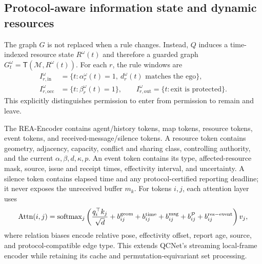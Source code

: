 \documentclass[letterpaper]{article} %
\newcommand{\Pset}{\ensuremath{\mathcal P}}
\newcommand{\Mset}{\ensuremath{\mathcal M}}
\begin{document}
\subsection{Protocol-aware information state and dynamic resources}
\label{sec:rea}
The graph $G$ is not replaced when a rule changes. Instead, $Q$ induces a time-indexed resource state $R^\omega(t)$ and therefore a guarded graph $G^\omega_t=\mathsf T(\Mset,R^\omega(t))$. For each $r$, the rule windows are
\begin{align}
I_{r,\mathrm{in}}^\omega&=\{t:\alpha_r^\omega(t)=1,\ d_r^\omega(t)\text{ matches the ego}\},\nonumber\\
I_{r,\mathrm{occ}}^\omega&=\{t:\beta_r^\omega(t)=1\},\qquad
I_{r,\mathrm{out}}^\omega=\{t:\text{exit is protected}\}.
\label{eq:rule-windows}
\end{align}
This explicitly distinguishes permission to enter from permission to remain and leave.

The REA-Encoder contains agent/history tokens, map tokens, resource tokens, event tokens, and received-message/silence tokens. A resource token contains geometry, adjacency, capacity, conflict and sharing class, controlling authority, and the current $\alpha,\beta,d,\kappa,p$. An event token contains its type, affected-resource mask, source, issue and receipt times, effectivity interval, and uncertainty. A silence token contains elapsed time and any protocol-certified reporting deadline; it never exposes the unreceived buffer $m_k$. For tokens $i,j$, each attention layer uses
\begin{equation}
\operatorname{Attn}(i,j)=
\operatorname{softmax}_j\left(
\frac{q_i^\top k_j}{\sqrt d}
+b^{\rm geom}_{ij}+b^{\rm time}_{ij}+b^{\rm msg}_{ij}
+b^{\Pset}_{ij}+b^{\rm res-event}_{ij}\right)v_j ,
\label{eq:rea-attn}
\end{equation}
where relation biases encode relative pose, effectivity offset, report age, source, and protocol-compatible edge type. This extends QCNet's streaming local-frame encoder while retaining its cache and permutation-equivariant set processing.
\end{document}
